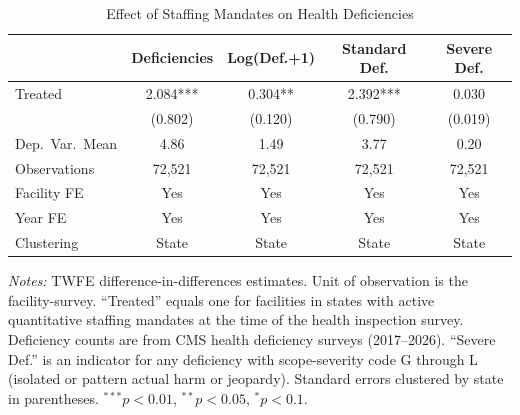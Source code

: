 \begin{table}[htbp]
\centering
\caption{Effect of Staffing Mandates on Health Deficiencies}
\label{tab:main_did}
\begin{tabular}{lcccc}
\hline\hline
 & Deficiencies & Log(Def.+1) & Standard Def. & Severe Def. \\
\hline
Treated & 2.084*** & 0.304** & 2.392*** & 0.030 \\
 & (0.802) & (0.120) & (0.790) & (0.019) \\
\hline
Dep.\ Var.\ Mean & 4.86 & 1.49 & 3.77 & 0.20 \\
Observations & 72,521 & 72,521 & 72,521 & 72,521 \\
Facility FE & Yes & Yes & Yes & Yes \\
Year FE & Yes & Yes & Yes & Yes \\
Clustering & State & State & State & State \\
\hline\hline
\end{tabular}
\begin{tablenotes}[flushleft]
\small
\item \textit{Notes:} TWFE difference-in-differences estimates. Unit of observation is the facility-survey. ``Treated'' equals one for facilities in states with active quantitative staffing mandates at the time of the health inspection survey. Deficiency counts are from CMS health deficiency surveys (2017--2026). ``Severe Def.'' is an indicator for any deficiency with scope-severity code G through L (isolated or pattern actual harm or jeopardy). Standard errors clustered by state in parentheses. $^{***}p<0.01$, $^{**}p<0.05$, $^{*}p<0.1$.
\end{tablenotes}
\end{table}
